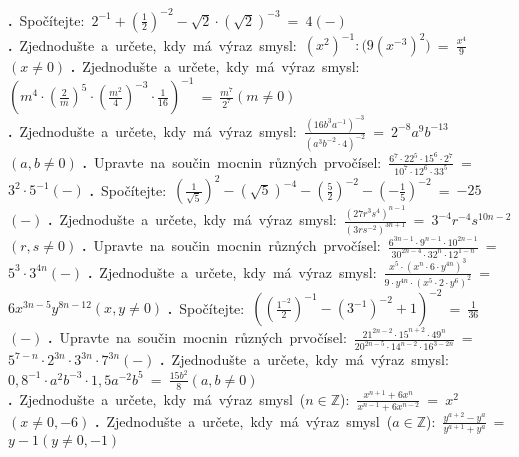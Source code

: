 \documentclass[12pt,a4paper]{extarticle}
\def\priklad#1#2#3{\advance\pr1\nointerlineskip\vbox to.071\vsize{\vss\hbox{{\Large\bfseries \tym\ifnum\pr<10 0\fi\the\pr}\quad#1}\vss}\vfil}
\def\printtym#1{\pr0\def\tym{#1}\priklady\vfill\newpage}
\def\priklad#1#2#3{\advance\pr1 \hbox{\textbf{\the\pr.} #1 = #2\qquad$(#3)$}\bigskip}
\def\Z{\mathbb Z}
\begin{document}
\def\priklady{%
\priklad{Spočítejte: $2^{-1} + \left(\frac12\right)^{-2} - \sqrt2 \cdot (\sqrt{2})^{-3}$}{$4$}{-}
\priklad{Zjednodušte a určete, kdy má výraz smysl: $(x^2)^{-1} : \bigl(9(x^{-3})^2\bigr)$}{$\frac{x^4}{9}$}{x \neq 0}
\priklad{Zjednodušte a určete, kdy má výraz smysl: $\left(m^4 \cdot\left(\frac 2m\right)^5 \cdot \left(\frac{m^2}{4}\right)^{-3} \cdot \frac{1}{16}\right)^{-1}$}{$\frac{m^7}{2^7}$}{m \neq 0}
\priklad{Zjednodušte a určete, kdy má výraz smysl: $\frac{(16b^3a^{-1})^{-3}}{(a^3b^{-2}\cdot 4)^{-2}}$}{$2^{-8}a^9b^{-13}$}{a, b \neq 0}
\priklad{Upravte na součin mocnin různých prvočísel: $\frac{6^7 \cdot 22^5 \cdot 15^6 \cdot 2^7}{10^7 \cdot 12^6 \cdot 33^5}$}{$3^2 \cdot 5^{-1}$}{-}
\priklad{Spočítejte: $\left(\frac{1}{\sqrt5}\right)^2 - (\sqrt5)^{-4} - \left(\frac52\right)^{-2} - \left(-\frac15\right)^{-2}$}{$-25$}{-}
\priklad{Zjednodušte a určete, kdy má výraz smysl: $\frac{(27r^3s^4)^{n-1}}{(3rs^{-2})^{3n+1}}$}{$3^{-4}r^{-4}s^{10n-2}$}{r, s \neq 0}
\priklad{Upravte na součin mocnin různých prvočísel: $\frac{6^{3n-1} \cdot 9^{n-1} \cdot 10^{2n-1}}{30^{2n-4} \cdot 32^n \cdot 12^{1-n}}$}{$5^3 \cdot 3^{4n}$}{-}
\priklad{Zjednodušte a určete, kdy má výraz smysl: $\frac{x^5 \cdot (x^n \cdot 6 \cdot y^{4n})^3}{9\cdot y^{4n} \cdot (x^5 \cdot 2 \cdot y^6)^2}$}{$6 x^{3n-5} y^{8n-12}$}{x, y \neq 0}
\priklad{Spočítejte: $\left( \left(\frac{1^{-2}}{2}\right)^{-1} - (3^{-1})^{-2} + 1 \right)^{-2}$}{$\frac{1}{36}$}{-}
\priklad{Upravte na součin mocnin různých prvočísel: $\frac{21^{2n-2} \cdot 15^{n+2} \cdot 49^n}{20^{2n-5}\cdot 14^{n-2} \cdot 16^{3-2n}}$}{$5^{7-n} \cdot 2^{3n} \cdot 3^{3n} \cdot 7^{3n}$}{-}
\priklad{Zjednodušte a určete, kdy má výraz smysl: $0{,}8^{-1} \cdot a^2b^{-3} \cdot 1{,}5a^{-2}b^5$}{$\frac{15b^2}{8}$}{a, b \neq 0}
\priklad{Zjednodušte a určete, kdy má výraz smysl ($n \in \Z$): $\frac{x^{n+1} + 6x^n}{x^{n-1} + 6x^{n-2}}$}{$x^2$}{x \neq 0, -6}
\priklad{Zjednodušte a určete, kdy má výraz smysl ($a \in \Z$): $\frac{y^{a+2} - y^a}{y^{a+1} + y^a}$}{$y-1$}{y \neq 0, -1}
}


\printtym{A}
\end{document}
